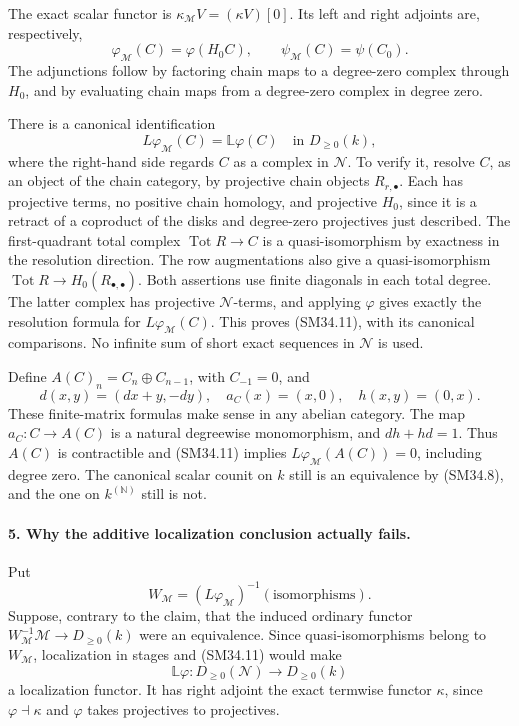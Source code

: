 The exact scalar functor is
\(\kappa_{\mathcal M}V=(\kappa V)[0]\).  Its left and
right adjoints are, respectively,
\[
       \varphi_{\mathcal M}(C)=\varphi(H_0C),\qquad
                     \psi_{\mathcal M}(C)=\psi(C_0).           \tag{SM34.10}
\]
The adjunctions follow by factoring chain maps to a
degree-zero complex through \(H_0\), and by evaluating
chain maps from a degree-zero complex in degree zero.

There is a canonical identification
\[
       L\varphi_{\mathcal M}(C)=\mathbb L\varphi(C)
                                  \quad\text{in }D_{\ge0}(k), \tag{SM34.11}
\]
where the right-hand side regards \(C\) as a complex in
\(\mathcal N\).  To verify it, resolve \(C\), as an
object of the chain category, by projective chain objects
\(R_{r,\bullet}\).  Each has projective terms,
no positive chain homology, and projective \(H_0\), since
it is a retract of a coproduct of the disks and degree-zero
projectives just described.  The first-quadrant total
complex \(\operatorname{Tot}R\to C\) is a quasi-isomorphism
by exactness in the resolution direction.  The row
augmentations also give a quasi-isomorphism
\(\operatorname{Tot}R\to H_0(R_{\bullet,\bullet})\).
Both assertions use finite diagonals in each total degree.
The latter complex has projective \(\mathcal N\)-terms,
and applying \(\varphi\) gives exactly the resolution
formula for \(L\varphi_{\mathcal M}(C)\).  This proves
(SM34.11), with its canonical comparisons.  No infinite
sum of short exact sequences in \(\mathcal N\) is used.

Define \(A(C)_n=C_n\oplus C_{n-1}\), with \(C_{-1}=0\),
and
\[
        d(x,y)=(dx+y,-dy),\quad
        a_C(x)=(x,0),\quad h(x,y)=(0,x).                     \tag{SM34.12}
\]
These finite-matrix formulas make sense in any abelian
category.  The map \(a_C:C\to A(C)\) is a natural
degreewise monomorphism, and \(dh+hd=1\).
Thus \(A(C)\) is contractible and (SM34.11) implies
\(L\varphi_{\mathcal M}(A(C))=0\), including degree zero.
The canonical scalar counit on \(k\) still is an
equivalence by (SM34.8), and the one on
\(k^{(\mathbb N)}\) still is not.

\paragraph{5. Why the additive localization conclusion actually fails.}
Put
\[
 W_{\mathcal M}=(L\varphi_{\mathcal M})^{-1}
                         (\text{isomorphisms}).
\]
Suppose, contrary to the claim,
that the induced ordinary functor
\(W_{\mathcal M}^{-1}\mathcal M\to D_{\ge0}(k)\)
were an equivalence.  Since quasi-isomorphisms belong to
\(W_{\mathcal M}\), localization in stages and (SM34.11)
would make
\[
          \mathbb L\varphi:D_{\ge0}(\mathcal N)
                                         \longrightarrow D_{\ge0}(k)
\]
a localization functor.  It has right adjoint the exact
termwise functor \(\kappa\), since
\(\varphi\dashv\kappa\) and \(\varphi\) takes
projectives to projectives.

